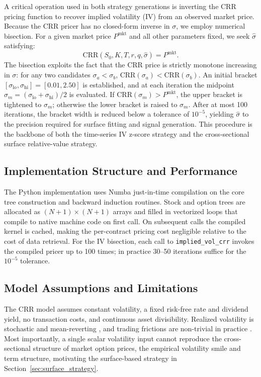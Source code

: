 \documentclass[10pt,twocolumn]{article}
\begin{document}
A critical operation used in both strategy generations is inverting the CRR
pricing function to recover implied volatility (IV) from an observed market
price. Because the CRR pricer has no closed-form inverse in $\sigma$, we
employ numerical bisection. For a given market price $P^{\text{mkt}}$ and all
other parameters fixed, we seek $\hat{\sigma}$ satisfying:
%
\begin{equation}
\text{CRR}(S_0, K, T, r, q, \hat{\sigma}) = P^{\text{mkt}}.
\end{equation}
%
The bisection exploits the fact that the CRR price is strictly monotone
increasing in $\sigma$: for any two candidates $\sigma_a < \sigma_b$,
$\text{CRR}(\sigma_a) < \text{CRR}(\sigma_b)$. An initial bracket
$[\sigma_{\text{lo}}, \sigma_{\text{hi}}] = [0.01, 2.50]$ is established,
and at each iteration the midpoint $\sigma_m = (\sigma_{\text{lo}} +
\sigma_{\text{hi}})/2$ is evaluated. If $\text{CRR}(\sigma_m) >
P^{\text{mkt}}$, the upper bracket is tightened to $\sigma_m$; otherwise
the lower bracket is raised to $\sigma_m$. After at most 100 iterations,
the bracket width is reduced below a tolerance of $10^{-5}$, yielding
$\hat{\sigma}$ to the precision required for surface fitting and signal
generation. This procedure is the backbone of both the time-series IV
z-score strategy and the cross-sectional surface relative-value strategy.

\subsection{Implementation Structure and Performance}

The Python implementation uses Numba \cite{lam2015} just-in-time compilation
on the core tree construction and backward induction routines. Stock and
option trees are allocated as $(N+1) \times (N+1)$ arrays and filled in
vectorized loops that compile to native machine code on first call. On
subsequent calls the compiled kernel is cached, making the per-contract
pricing cost negligible relative to the cost of data retrieval. For the IV
bisection, each call to \texttt{implied\_vol\_crr} invokes the compiled pricer
up to 100 times; in practice 30--50 iterations suffice for the $10^{-5}$
tolerance.

\subsection{Model Assumptions and Limitations}

The CRR model assumes constant volatility, a fixed risk-free rate and dividend
yield, no transaction costs, and continuous asset divisibility. Realized
volatility is stochastic and mean-reverting \cite{andersen2003,bollerslev1986},
and trading frictions are non-trivial in practice \cite{whalley1997}. Most
importantly, a single scalar volatility input cannot reproduce the cross-sectional
structure of market option prices, the empirical volatility smile and term
structure, motivating the surface-based strategy in
Section~\ref{sec:surface_strategy}.
\end{document}
